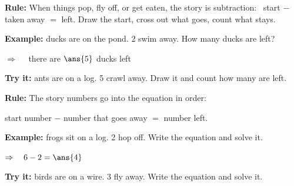 \documentclass[12pt]{article}
\begin{document}


\begin{formulabox}
\textbf{Rule:} When things pop, fly off, or get eaten, the story is
subtraction: \ start $-$ taken away $=$ left. Draw the start, cross out what
goes, count what stays.
\end{formulabox}

\begin{examplebox}
\textbf{Example:}  ducks are on the pond. 2 swim away. How many ducks
are left?

$\Rightarrow\quad$ there are $\ans{5}$ ducks left
\end{examplebox}

\begin{tryitbox}
\textbf{Try it:}  ants are on a log. 5 crawl away. Draw it and count
how many are left.\\[2pt]
\end{tryitbox}


\begin{formulabox}
\textbf{Rule:} The story numbers go into the equation in order:\par
start number $-$ number that goes away $=$ number left.
\end{formulabox}

\begin{examplebox}
\textbf{Example:}  frogs sit on a log. 2 hop off. Write the equation
and solve it.

$\Rightarrow\quad 6 - 2 = \ans{4}$
\end{examplebox}

\begin{tryitbox}
\textbf{Try it:}  birds are on a wire. 3 fly away. Write the equation
and solve it.\\[2pt]
\end{tryitbox}
\end{document}
